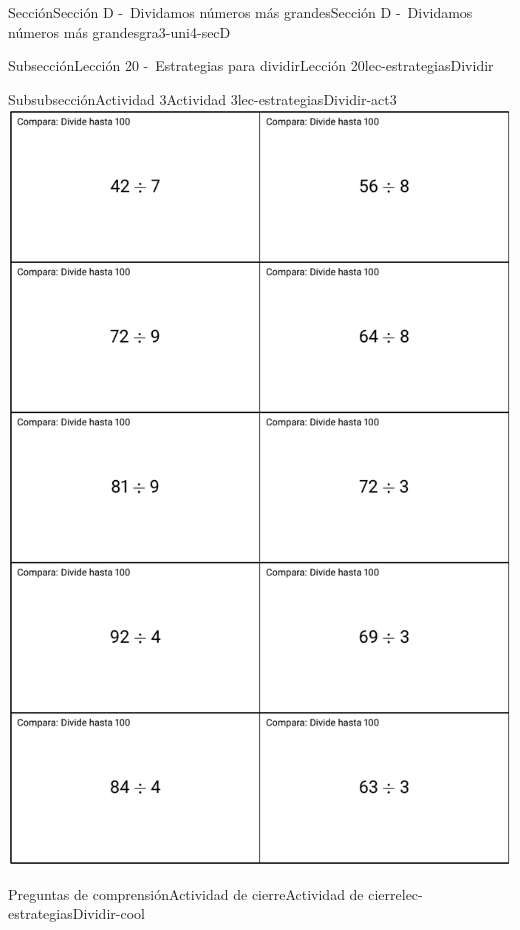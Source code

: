 \begin{sectionptx}{Sección}{Sección D -~Dividamos números más grandes}{}{Sección D -~Dividamos números más grandes}{}{}{gra3-uni4-secD}
\begin{subsectionptx}{Subsección}{Lección 20 -~Estrategias para dividir}{}{Lección 20}{}{}{lec-estrategiasDividir}
\begin{cutoutpage}
\begin{subsubsectionptx}{Subsubsección}{Actividad 3}{}{Actividad 3}{}{}{lec-estrategiasDividir-act3}
\includegraphics[max width=0.9\linewidth, center]{external/blm/tikz-source/act-comparaDivideHasta100-tarjetas-grandes2.pdf}
\end{subsubsectionptx}
\end{cutoutpage}
%
%
\typeout{************************************************}
\typeout{************************************************}
%
\begin{reading-questions-subsubsection}{Preguntas de comprensión}{Actividad de cierre}{}{Actividad de cierre}{}{}{lec-estrategiasDividir-cool}
%
\end{reading-questions-subsubsection}
\end{subsectionptx}
%
%
\typeout{************************************************}
\typeout{************************************************}

\end{sectionptx}

